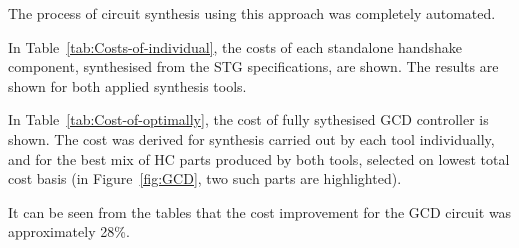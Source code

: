 The process of circuit synthesis using this approach was completely
automated.

In Table~\ref{tab:Costs-of-individual}, the costs of each standalone
handshake component, synthesised from the STG specifications, are
shown. The results are shown for both applied synthesis tools.

In Table~\ref{tab:Cost-of-optimally}, the cost of fully sythesised
GCD controller is shown. The cost was derived for synthesis carried
out by each tool individually, and for the best mix of HC parts produced
by both tools, selected on lowest total cost basis (in Figure~\ref{fig:GCD},
two such parts are highlighted).

It can be seen from the tables that the cost improvement for
the GCD circuit was approximately 28\%.
